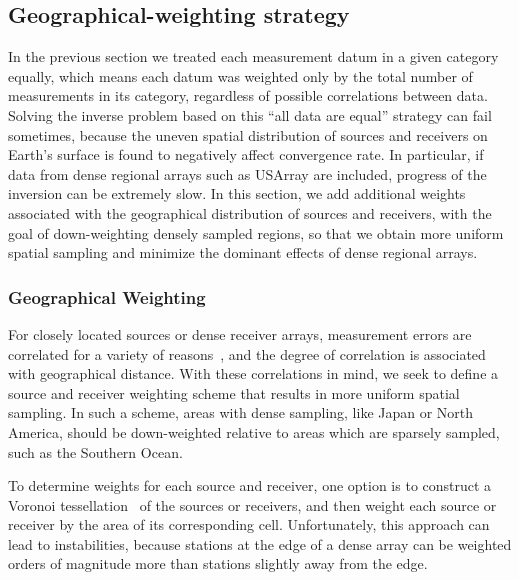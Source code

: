 \subsection{Geographical-weighting strategy}
\label{sec:geographical_weights}

In the previous section we treated each measurement datum in a given category 
equally, which means each datum was weighted only by the total number of measurements 
in its category, regardless of possible correlations between data. Solving the 
inverse problem based on this ``all data are equal'' strategy can fail sometimes, 
because the uneven spatial distribution of sources 
and receivers on Earth's surface is found to negatively affect convergence rate. 
In particular, if data from dense regional arrays such as USArray are included,  progress 
of the inversion can be extremely slow.  
In this section, we add additional weights associated with the geographical 
distribution of sources and receivers, with the goal of down-weighting 
densely sampled regions, so that we obtain more uniform spatial sampling
and minimize the dominant effects of dense regional arrays. 
  
\subsubsection{Geographical Weighting}
\label{sec:geographical}

For closely located sources or dense receiver arrays, measurement errors 
are correlated for a variety of reasons~\cite{Li1996}, and the degree of correlation 
is associated with geographical distance.
With these correlations in mind, we seek to define a source and receiver weighting scheme 
that results in more uniform spatial sampling.  In such a scheme, areas with dense sampling, 
like Japan or North America, should be down-weighted relative to areas which are sparsely 
sampled, such as the Southern Ocean.  %

To determine weights for each source and receiver, one option is to construct a Voronoi tessellation~\cite{Du1999} of the sources or receivers, 
and then weight each source or receiver by the area of its corresponding cell.
Unfortunately, this approach can lead to instabilities, because stations at the edge of a dense array can be weighted orders of magnitude more than stations slightly away from the edge. 

